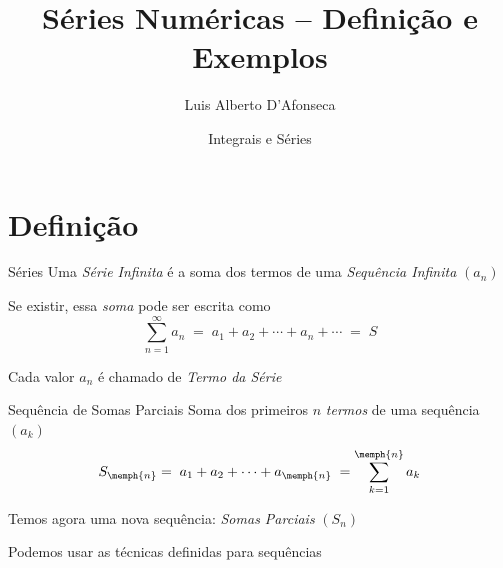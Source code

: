 
\usepackage{apresentacao}
\usepackage{mathconfig}
\usepackage{tabto}
\usepackage{cancel}

\graphicspath{{./figs/}}

\title {Séries Numéricas -- Definição e Exemplos}
\author{\large Luis Alberto D'Afonseca}
\date  {Integrais e Séries}



\begin{frame}
    \titlepage
\end{frame}

\section{Definição}

\begin{frame}{Séries}
    Uma \emph{Série Infinita} é a soma dos termos de uma \emph{Sequência Infinita} $(a_n)$

    \pause
    \vspace{\baselineskip}
    Se existir, essa \emph{soma} pode ser escrita como
    \[
      \sum_{n=1}^\infty a_n
      \;=\; a_1 + a_2 + \cdots + a_n + \cdots
      \;=\; S
    \]

    \pause
    Cada valor $a_n$ é chamado de \emph{Termo da Série}

\end{frame}

\begin{frame}{Sequência de Somas Parciais}
    Soma dos primeiros $n$ \emph{termos} de uma sequência $(a_k)$
    \[
      S_{\memph{n}}
      = \; a_1 + a_2 + \cdots + a_{\memph{n}} \;
      = \sum_{k=1}^{\memph{n}} a_k
    \]

    \pause
    Temos agora uma nova sequência: \emph{Somas Parciais} $(S_n)$

    \pause
    \vspace{\baselineskip}
    Podemos usar as técnicas definidas para sequências

\end{frame}

